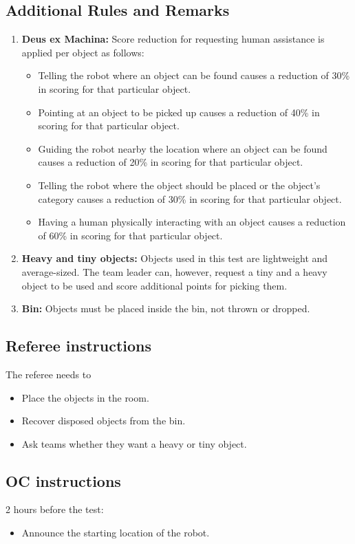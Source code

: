 \subsection{Additional Rules and Remarks}
\begin{enumerate}[nosep]
	\item \textbf{Deus ex Machina:} Score reduction for requesting human assistance is applied per object as follows:
	\begin{itemize}[nosep]
		\item Telling the robot where an object can be found causes a reduction of 30\% in scoring for that particular object.

		\item Pointing at an object to be picked up causes a reduction of 40\% in scoring for that particular object.
		
		\item Guiding the robot nearby the location where an object can be found causes a reduction of 20\% in scoring for that particular object.

		\item Telling the robot where the object should be placed or the object's category causes a reduction of 30\% in scoring for that particular object.

		\item Having a human physically interacting with an object causes a reduction of 60\% in scoring for that particular object.
	\end{itemize}
	
	\item \textbf{Heavy and tiny objects:} Objects used in this test are lightweight and average-sized.
	The team leader can, however, request a tiny and a heavy object to be used and score additional points for picking them.
	
	\item \textbf{Bin:} Objects must be placed inside the bin, not thrown or dropped.	
\end{enumerate}

\subsection{Referee instructions}
The referee needs to
\begin{itemize}
	\item Place the objects in the room.
	\item Recover disposed objects from the bin.
	\item Ask teams whether they want a heavy or tiny object.
\end{itemize}

\subsection{OC instructions}
2 hours before the test:
\begin{itemize}
	\item Announce the starting location of the robot.
\end{itemize}